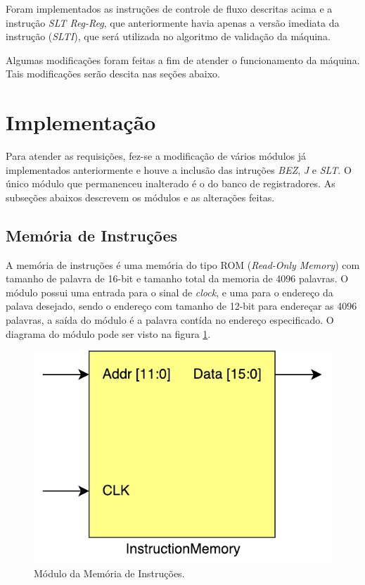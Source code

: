 \documentclass[11pt,a4paper,titlepage]{article}
\begin{document}
Foram implementados as instruções de controle de fluxo descritas acima e a instrução \textit{SLT Reg-Reg}, que anteriormente havia apenas a versão imediata da instrução (\textit{SLTI}), que será utilizada no algoritmo de validação da máquina.

Algumas modificações foram feitas a fim de atender o funcionamento da máquina. Tais modificações serão descita nas seções abaixo.

\section{Implementação}

Para atender as requisições, fez-se a modificação de vários módulos já implementados anteriormente e houve a inclusão das intruções \textit{BEZ}, \textit{J} e \textit{SLT}. O único módulo que permanenceu inalterado é o do banco de registradores. As subseções abaixos descrevem os módulos e as alterações feitas.

\subsection{Memória de Instruções}\label{subsec:imp-instmemory}

A memória de instruções é uma memória do tipo ROM (\textit{Read-Only Memory}) com tamanho de palavra de 16-bit e tamanho total da memoria de 4096 palavras. O módulo possui uma entrada para o sinal de \textit{clock}, e uma para o endereço da palava desejado, sendo o endereço com tamanho de 12-bit para endereçar as 4096 palavras, a saída do módulo é a palavra contída no endereço especificado. O diagrama do módulo pode ser visto na figura \ref{fig:instrmemory}.

\begin{figure}[!h]
\centering
\includegraphics[scale=0.5]{images/InstructionMemory.pdf}
\caption{Módulo da Memória de Instruções.}
\label{fig:instrmemory}
\end{figure}
\end{document}

